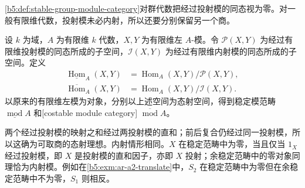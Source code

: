 \cref{b5:def:stable-group-module-category}对群代数把经过投射模的同态视为零。对一般有限维代数，投射模未必内射，所以还要分别保留另一个商。

\begin{definition}\label{b5:def:ar-stable-costable}
	设 \(k\) 为域，\(A\) 为有限维 \(k\) 代数，\(X,Y\) 为有限维左 \(A\)-模。令 \(\mathcal P(X,Y)\) 为经过有限维投射模的同态所成的子空间，\(\mathcal I(X,Y)\) 为经过有限维内射模的同态所成的子空间。定义
	\[
		\begin{aligned}
		\underline{\operatorname{Hom}}_A(X,Y)
		&=\operatorname{Hom}_A(X,Y)/\mathcal P(X,Y),\\
		\overline{\operatorname{Hom}}_A(X,Y)
		&=\operatorname{Hom}_A(X,Y)/\mathcal I(X,Y).
		\end{aligned}
	\]
	以原来的有限维左模为对象，分别以上述空间为态射空间，得到稳定模范畴 \(\underline{\operatorname{mod}}A\) 和[costable module category] \(\overline{\operatorname{mod}}A\)。
\end{definition}

两个经过投射模的映射之和经过两投射模的直和；前后复合仍经过同一投射模，所以这确为可取商的态射理想。内射情形相同。\(X\) 在稳定范畴中为零，当且仅当 \(1_X\) 经过投射模，即 \(X\) 是投射模的直和因子，亦即 \(X\) 投射；余稳定范畴中的零对象同理恰为内射模。例如在\cref{b5:exm:ar-a2-translate}中，\(S_2\) 在稳定范畴中为零但在余稳定范畴中不为零，\(S_1\) 则相反。

